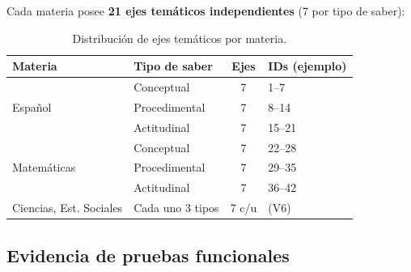 \documentclass[11pt,a4paper,oneside]{article}
\begin{document}
Cada materia posee \textbf{21 ejes temáticos independientes} (7 por tipo de saber):

\begin{table}[h]\centering\small
\begin{tabular}{@{}l l c l@{}}
\toprule
\textbf{Materia} & \textbf{Tipo de saber} & \textbf{Ejes} & \textbf{IDs (ejemplo)} \\
\midrule
\multirow{3}{*}{Español}     & Conceptual    & 7 & 1--7   \\
                             & Procedimental & 7 & 8--14  \\
                             & Actitudinal   & 7 & 15--21 \\ \midrule
\multirow{3}{*}{Matemáticas} & Conceptual    & 7 & 22--28 \\
                             & Procedimental & 7 & 29--35 \\
                             & Actitudinal   & 7 & 36--42 \\ \midrule
Ciencias, Est. Sociales      & Cada uno 3 tipos & 7 c/u & (V6) \\
\bottomrule
\end{tabular}
\caption{Distribución de ejes temáticos por materia.}
\end{table}

\subsection{Evidencia de pruebas funcionales}
\end{document}
